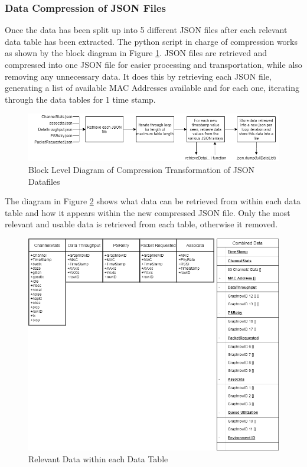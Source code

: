 \subsubsection{Data Compression of JSON Files}
\label{data_compression}
Once the data has been split up into 5 different JSON files after each relevant data table has been extracted. The python script in charge of compression works as shown by the block diagram in Figure \ref{fig:json_compression}. JSON files are retrieved and compressed into one JSON file for easier processing and transportation, while also removing any unnecessary data. It does this by retrieving each JSON file, generating a list of available MAC Addresses available and for each one, iterating through the data tables for 1 time stamp.
\begin{figure}[ht]
    \centering
    \includegraphics[width=1\linewidth]{pages/Chapter4/Chapter 4 Images/json_compression.png}
    \caption{Block Level Diagram of Compression Transformation of JSON Datafiles}
    \label{fig:json_compression}
\end{figure}
The diagram in Figure \ref{fig:data_table_data} shows what data can be retrieved from within each data table and how it appears within the new compressed JSON file. Only the most relevant and usable data is retrieved from each table, otherwise it removed.
\begin{figure}[ht]
    \centering
    \includegraphics[width=1\linewidth]{pages/Chapter4/Chapter 4 Images/router_data-Dataset Contains.png}
    \caption{Relevant Data within each Data Table}
    \label{fig:data_table_data}
\end{figure}



